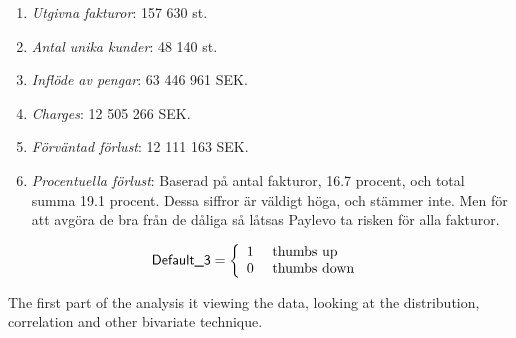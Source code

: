 \documentclass[swedish, english, 11pt ]{article}
\numberwithin{equation}{section}
\begin{document}
\begin{enumerate}[label=\emph{\arabic*})]
	\item \textit{Utgivna fakturor}: 157 630 st.
	\item \textit{Antal unika kunder}:  48 140 st.
	\item \textit{Inflöde av pengar}:  63 446 961 SEK. 
	\item \textit{Charges}:  12 505 266  SEK.
	\item \textit{Förväntad förlust}:  12 111 163  SEK.
	\item \textit{Procentuella förlust}: Baserad på antal fakturor,  16.7  procent,  och total summa
		19.1 procent. Dessa siffror är väldigt höga, och stämmer inte. Men för att avgöra de bra från de dåliga så 
		låtsas Paylevo ta risken för alla fakturor.
\end{enumerate}

\begin{equation*}
\label{eq:1}
\textsf{Default\_3}=\left\{
\begin{array}{c l}     
    1 & \textrm{  thumbs up }  \\
    0 & \textrm{ thumbs down  }  \\
    \end{array}\right.
\end{equation*}

The first part of the analysis it viewing the data, looking at the distribution, correlation and other bivariate technique.  
\end{document}
